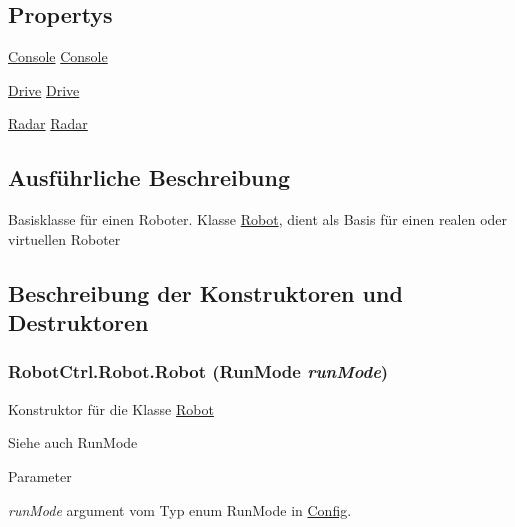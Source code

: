 \subsection*{Propertys}
\begin{DoxyCompactItemize}
\item 
\hyperlink{class_robot_ctrl_1_1_console}{Console} \hyperlink{class_robot_ctrl_1_1_robot_ae78d1691cc943383977741712962bf82}{Console}
\item 
\hyperlink{class_robot_ctrl_1_1_drive}{Drive} \hyperlink{class_robot_ctrl_1_1_robot_a6e1e59f43f8578d78da6c6a19e55f269}{Drive}
\item 
\hyperlink{class_robot_ctrl_1_1_radar}{Radar} \hyperlink{class_robot_ctrl_1_1_robot_adcc563b2531e72dcdfb9af5cafda1cbc}{Radar}
\end{DoxyCompactItemize}


\subsection{Ausführliche Beschreibung}
Basisklasse f\"{u}r einen Roboter. Klasse \hyperlink{class_robot_ctrl_1_1_robot}{Robot}, dient als Basis f\"{u}r einen realen oder virtuellen Roboter 

\subsection{Beschreibung der Konstruktoren und Destruktoren}
\hypertarget{class_robot_ctrl_1_1_robot_acdd921df41328916b058eaad84ed3078}{
\subsubsection[{Robot}]{\setlength{\rightskip}{0pt plus 5cm}RobotCtrl.Robot.Robot (RunMode {\em runMode})}}
\label{class_robot_ctrl_1_1_robot_acdd921df41328916b058eaad84ed3078}
Konstruktor f\"{u}r die Klasse \hyperlink{class_robot_ctrl_1_1_robot}{Robot} \begin{DoxySeeAlso}{Siehe auch}
RunMode
\end{DoxySeeAlso}

\begin{DoxyParams}{Parameter}
\item[{\em runMode}]argument vom Typ enum RunMode in \hyperlink{class_robot_ctrl_1_1_config}{Config}. \end{DoxyParams}


